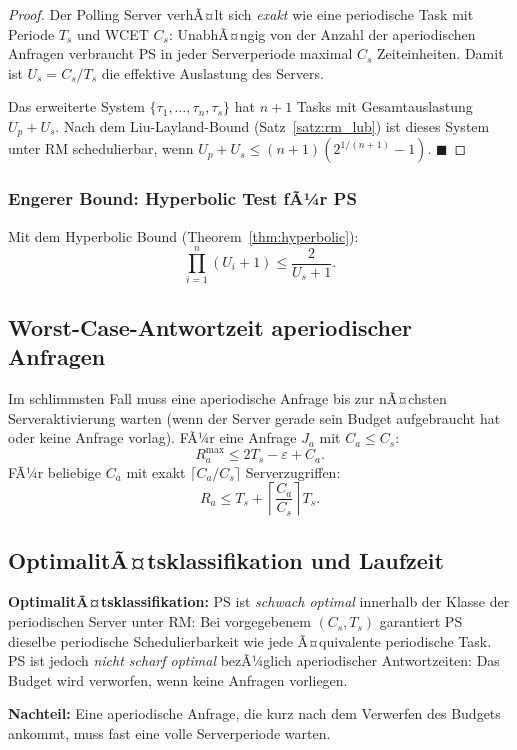 ﻿\documentclass[a4paper,12pt]{report}
\theoremstyle{definition}
\begin{document}
\begin{proof}
	Der Polling Server verhÃ¤lt sich \emph{exakt} wie eine periodische Task mit
	Periode $T_s$ und WCET $C_s$: UnabhÃ¤ngig von der Anzahl der aperiodischen
	Anfragen verbraucht PS in jeder Serverperiode maximal $C_s$ Zeiteinheiten.
	Damit ist $U_s = C_s/T_s$ die effektive Auslastung des Servers.

	Das erweiterte System $\{\tau_1,\ldots,\tau_n, \tau_s\}$ hat $n+1$ Tasks
	mit Gesamtauslastung $U_p + U_s$. Nach dem Liu-Layland-Bound (Satz~\ref{satz:rm_lub})
	ist dieses System unter RM schedulierbar, wenn
	$U_p + U_s \leq (n+1)(2^{1/(n+1)}-1)$. \hfill$\blacksquare$
\end{proof}

\subsubsection{Engerer Bound: Hyperbolic Test fÃ¼r PS}

Mit dem Hyperbolic Bound (Theorem~\ref{thm:hyperbolic}):
\[
	\prod_{i=1}^{n}(U_i + 1) \leq \frac{2}{U_s + 1}.
\]

\subsection{Worst-Case-Antwortzeit aperiodischer Anfragen}

Im schlimmsten Fall muss eine aperiodische Anfrage bis zur nÃ¤chsten Serveraktivierung
warten (wenn der Server gerade sein Budget aufgebraucht hat oder keine Anfrage
vorlag). FÃ¼r eine Anfrage $J_a$ mit $C_a \leq C_s$:
\[
	R_a^{\max} \leq 2T_s - \varepsilon + C_a.
\]
FÃ¼r beliebige $C_a$ mit exakt $\lceil C_a/C_s \rceil$ Serverzugriffen:
\[
	R_a \leq T_s + \left\lceil \frac{C_a}{C_s} \right\rceil T_s.
\]

\subsection{OptimalitÃ¤tsklassifikation und Laufzeit}

\textbf{OptimalitÃ¤tsklassifikation:} PS ist \emph{schwach optimal} innerhalb
der Klasse der periodischen Server unter RM: Bei vorgegebenem $(C_s, T_s)$
garantiert PS dieselbe periodische Schedulierbarkeit wie jede Ã¤quivalente
periodische Task. PS ist jedoch \emph{nicht scharf optimal} bezÃ¼glich aperiodischer
Antwortzeiten: Das Budget wird verworfen, wenn keine Anfragen vorliegen.

\textbf{Nachteil:} Eine aperiodische Anfrage, die kurz nach dem Verwerfen des
Budgets ankommt, muss fast eine volle Serverperiode warten.
\end{document}
